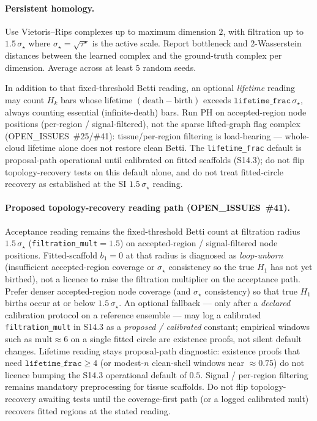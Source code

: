 \documentclass[11pt]{article}
\begin{document}
\paragraph{Persistent homology.}
Use Vietoris--Rips complexes up to maximum dimension $2$, with filtration up to $1.5\,\sigma_\star$ where $\sigma_\star=\sqrt{\tau^\star}$ is the active scale. Report bottleneck and 2-Wasserstein distances between the learned complex and the ground-truth complex per dimension. Average across at least $5$ random seeds.

In addition to that fixed-threshold Betti reading, an optional \emph{lifetime}
reading may count $H_k$ bars whose lifetime $(\mathrm{death}-\mathrm{birth})$
exceeds $\texttt{lifetime\_frac}\,\sigma_\star$, always counting essential
(infinite-death) bars. Run PH on accepted-region node positions (per-region /
signal-filtered), not the sparse lifted-graph flag complex
(OPEN\_ISSUES~\#25/\#41): tissue/per-region filtering is load-bearing ---
whole-cloud lifetime alone does not restore clean Betti. The
\texttt{lifetime\_frac} default is proposal-path operational until calibrated on
fitted scaffolds (S14.3); do not flip topology-recovery tests on this default
alone, and do not treat fitted-circle recovery as established at the SI
$1.5\,\sigma_\star$ reading.

\paragraph{Proposed topology-recovery reading path
(OPEN\_ISSUES~\#41).}
Acceptance reading remains the fixed-threshold Betti count at filtration
radius $1.5\,\sigma_\star$
(\texttt{filtration\_mult}${}=1.5$) on accepted-region / signal-filtered node
positions. Fitted-scaffold $b_1=0$ at that radius is diagnosed as
\emph{loop-unborn} (insufficient accepted-region coverage or $\sigma_\star$
consistency so the true $H_1$ has not yet birthed), not a licence to raise the
filtration multiplier on the acceptance path. Prefer denser accepted-region
node coverage (and $\sigma_\star$ consistency) so that true $H_1$ births occur
at or below $1.5\,\sigma_\star$. An optional fallback --- only after a
\emph{declared} calibration protocol on a reference ensemble --- may log a
calibrated \texttt{filtration\_mult} in S14.3 as a \emph{proposed / calibrated}
constant; empirical windows such as $\mathrm{mult}\approx6$ on a single fitted
circle are existence proofs, not silent default changes. Lifetime reading stays
proposal-path diagnostic: existence proofs that need
$\texttt{lifetime\_frac}\ge4$ (or modest-$n$ clean-shell windows near
$\approx0.75$) do not licence bumping the S14.3 operational default of $0.5$.
Signal / per-region filtering remains mandatory preprocessing for tissue
scaffolds. Do not flip topology-recovery awaiting tests until the
coverage-first path (or a logged calibrated mult) recovers fitted regions at
the stated reading.
\end{document}
